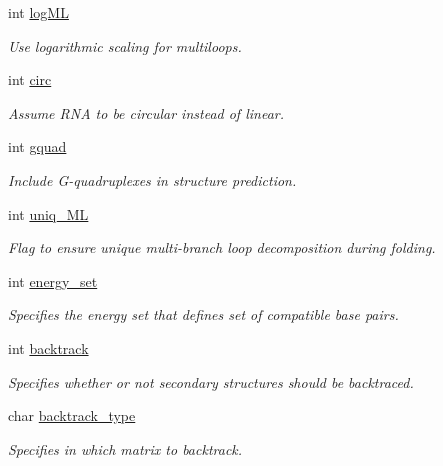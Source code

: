 \begin{DoxyCompactItemize}
int \mbox{\hyperlink{group__model__details_ae259f89a94acae0c7f1412603e7f57b5}{log\+ML}}
\begin{DoxyCompactList}\small\item\em Use logarithmic scaling for multiloops. \end{DoxyCompactList}\item 
int \mbox{\hyperlink{group__model__details_a92762e1008503d4623ff5c01e358a464}{circ}}
\begin{DoxyCompactList}\small\item\em Assume R\+NA to be circular instead of linear. \end{DoxyCompactList}\item 
int \mbox{\hyperlink{group__model__details_af88a511a2b1f526b4c6213de6cb8fd6e}{gquad}}
\begin{DoxyCompactList}\small\item\em Include G-\/quadruplexes in structure prediction. \end{DoxyCompactList}\item 
int \mbox{\hyperlink{group__model__details_ade065b814a4e2e72ead93ab502613ed2}{uniq\+\_\+\+ML}}
\begin{DoxyCompactList}\small\item\em Flag to ensure unique multi-\/branch loop decomposition during folding. \end{DoxyCompactList}\item 
int \mbox{\hyperlink{group__model__details_a5eee4e3b468eb690d1407e0178dafb3f}{energy\+\_\+set}}
\begin{DoxyCompactList}\small\item\em Specifies the energy set that defines set of compatible base pairs. \end{DoxyCompactList}\item 
int \mbox{\hyperlink{group__model__details_a31f4471608cbdd03887f63c281823adb}{backtrack}}
\begin{DoxyCompactList}\small\item\em Specifies whether or not secondary structures should be backtraced. \end{DoxyCompactList}\item 
char \mbox{\hyperlink{group__model__details_abb265da25121d22ed11c8435861f0e53}{backtrack\+\_\+type}}
\begin{DoxyCompactList}\small\item\em Specifies in which matrix to backtrack. \end{DoxyCompactList}\item 

\end{DoxyCompactItemize}
